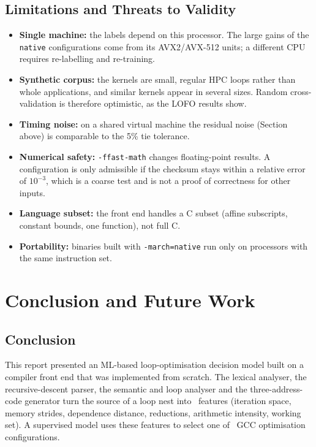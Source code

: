 \documentclass[12pt,a4paper]{article}
\begin{document}
\subsection{Limitations and Threats to Validity}
\label{sec:limits}

\begin{itemize}
    \item \textbf{Single machine:} the labels depend on this processor. The large gains of the
    \texttt{native} configurations come from its AVX2/AVX-512 units; a different CPU requires re-labelling and re-training.
    \item \textbf{Synthetic corpus:} the kernels are small, regular HPC loops rather than whole applications, and similar
    kernels appear in several sizes. Random cross-validation is therefore optimistic, as the LOFO results show.
    \item \textbf{Timing noise:} on a shared virtual machine the residual noise (Section above) is comparable to the 5\% tie tolerance.
    \item \textbf{Numerical safety:} \texttt{-ffast-math} changes floating-point results. A configuration is only admissible if
    the checksum stays within a relative error of $10^{-3}$, which is a coarse test and is not a proof of correctness for other inputs.
    \item \textbf{Language subset:} the front end handles a C subset (affine subscripts, constant bounds, one function), not full C.
    \item \textbf{Portability:} binaries built with \texttt{-march=native} run only on processors with the same instruction set.
\end{itemize}

\newpage

\section{Conclusion and Future Work}

\subsection{Conclusion}

This report presented an ML-based loop-optimisation decision model built on a compiler
front end that was implemented from scratch. The lexical analyser, the recursive-descent parser,
the semantic and loop analyser and the three-address-code generator turn the source of a loop nest into
\numFeatures\ features (iteration space, memory strides, dependence distance, reductions,
arithmetic intensity, working set). A supervised model uses these features to select one of
\numConfigs\ GCC optimisation configurations.
\end{document}
